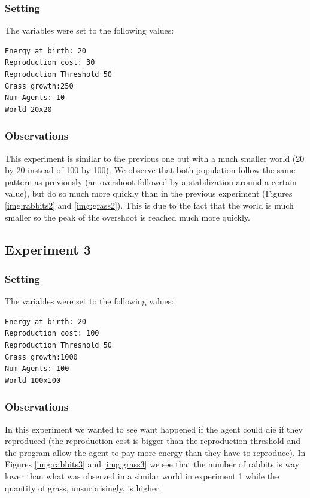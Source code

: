 \documentclass[11pt]{article}
\begin{document}
\subsubsection{Setting}
The variables were set to the following values:
\begin{lstlisting}
Energy at birth: 20
Reproduction cost: 30
Reproduction Threshold 50
Grass growth:250
Num Agents: 10
World 20x20
\end{lstlisting}

\subsubsection{Observations}
This experiment is similar to the previous one but with a much smaller world (20 by 20 instead of 100 by 100). We observe that both population follow the same pattern as previously (an overshoot followed by a stabilization around a certain value), but do so much more quickly than in the previous experiment (Figures \ref{img:rabbits2} and \ref{img:grass2}). This is due to the fact that the world is much smaller so the peak of the overshoot is reached much more quickly.

\subsection{Experiment 3}
\label{sec:experiment3}

\subsubsection{Setting}
The variables were set to the following values:
\begin{lstlisting}
Energy at birth: 20
Reproduction cost: 100
Reproduction Threshold 50
Grass growth:1000
Num Agents: 100
World 100x100
\end{lstlisting}
\subsubsection{Observations}
In this experiment we wanted to see want happened if the agent could die if they reproduced (the reproduction cost is bigger than the reproduction threshold and the program allow the agent to pay more energy than they have to reproduce). In Figures \ref{img:rabbits3} and \ref{img:grass3} we see that the number of rabbits is way lower than what was observed in a similar world in experiment 1 while the quantity of grass, unsurprisingly, is higher.
\end{document}
